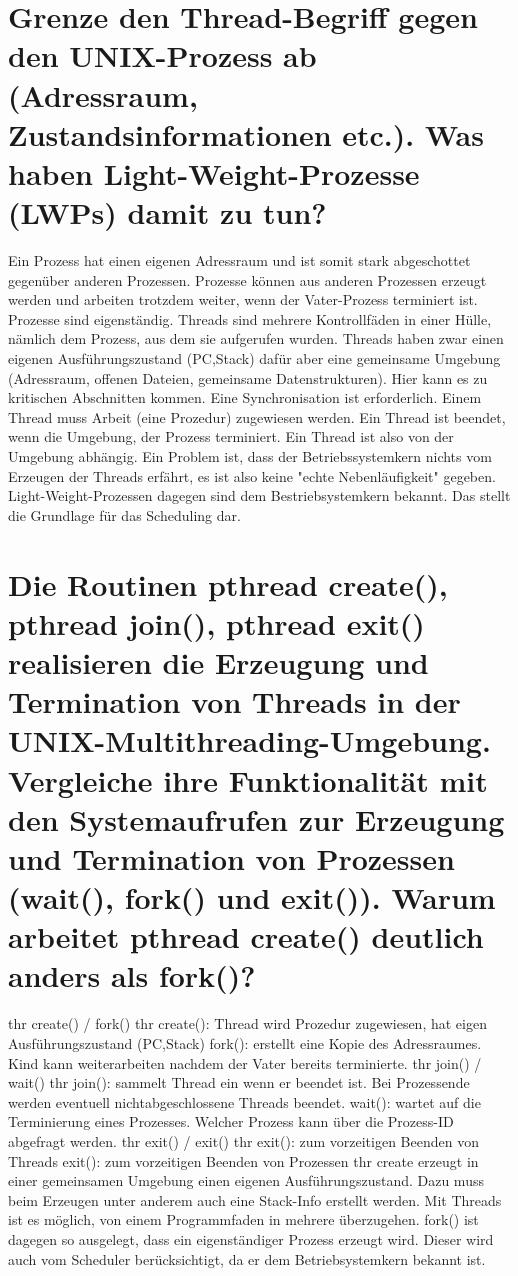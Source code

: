 \documentclass[12pt,a4paper,ngerman]{scrartcl}
\newcommand{\question}[1]{#1}
\newenvironment {answer}
                {}
                {}
\begin{document}
\section{\question{Grenze den Thread-Begriff gegen den UNIX-Prozess ab (Adressraum, Zustandsinformationen etc.). Was haben Light-Weight-Prozesse (LWPs) damit zu tun?}}
\begin{answer}
Ein Prozess hat einen eigenen Adressraum und ist somit stark abgeschottet gegenüber anderen
Prozessen. Prozesse können aus anderen Prozessen erzeugt werden und arbeiten trotzdem weiter,
wenn der Vater-Prozess terminiert ist. Prozesse sind eigenständig.
Threads sind mehrere Kontrollfäden in einer Hülle, nämlich dem Prozess, aus dem sie aufgerufen
wurden. Threads haben zwar einen eigenen Ausführungszustand (PC,Stack) dafür aber eine
gemeinsame Umgebung (Adressraum, offenen Dateien, gemeinsame Datenstrukturen). Hier kann
es zu kritischen Abschnitten kommen. Eine Synchronisation ist erforderlich. Einem Thread muss
Arbeit (eine Prozedur) zugewiesen werden. Ein Thread ist beendet, wenn die Umgebung, der Prozess
terminiert. Ein Thread ist also von der Umgebung abhängig.
Ein Problem ist, dass der Betriebssystemkern nichts vom Erzeugen der Threads erfährt, es ist also
keine "echte Nebenläufigkeit" gegeben.
Light-Weight-Prozessen dagegen sind dem Bestriebsystemkern bekannt. Das stellt die Grundlage
für das Scheduling dar.
\end{answer}

\section{\question{Die Routinen pthread create(), pthread join(), pthread exit() realisieren die Erzeugung und Termination von Threads in der UNIX-Multithreading-Umgebung. Vergleiche ihre Funktionalität mit den Systemaufrufen zur Erzeugung und Termination von Prozessen (wait(), fork() und exit()). Warum arbeitet pthread create() deutlich anders als fork()?}}
\begin{answer}
thr create() / fork()
thr create():
Thread wird Prozedur zugewiesen, hat eigen Ausführungszustand (PC,Stack)
fork():
erstellt eine Kopie des Adressraumes. Kind kann weiterarbeiten nachdem der Vater bereits terminierte.
thr join() / wait()
thr join():
sammelt Thread ein wenn er beendet ist. Bei Prozessende werden eventuell nichtabgeschlossene
Threads beendet.
wait():
wartet auf die Terminierung eines Prozesses. Welcher Prozess kann über die Prozess-ID abgefragt
werden.
thr exit() / exit()
thr exit():
zum vorzeitigen Beenden von Threads
exit():
zum vorzeitigen Beenden von Prozessen
thr create erzeugt in einer gemeinsamen Umgebung einen eigenen Ausführungszustand. Dazu muss
beim Erzeugen unter anderem auch eine Stack-Info erstellt werden. Mit Threads ist es möglich,
von einem Programmfaden in mehrere überzugehen. fork() ist dagegen so ausgelegt, dass ein
eigenständiger Prozess erzeugt wird. Dieser wird auch vom Scheduler berücksichtigt, da er dem
Betriebsystemkern bekannt ist.
\end{answer}
\end{document}
